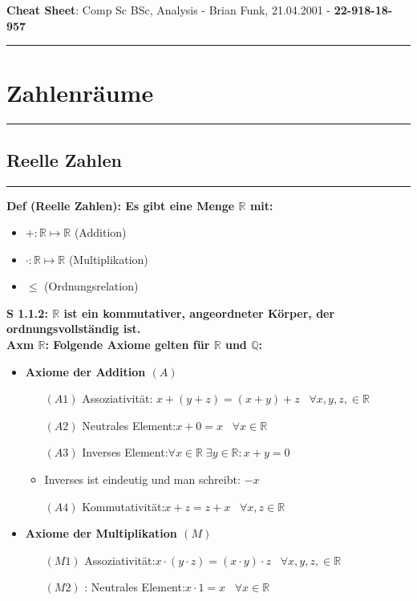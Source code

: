 \documentclass[7pt,landscape, margin = 0.1mm]{article}
\newcommand{\titellinie}{\rule{1.\linewidth}{0.75pt}}
\newcommand*{\mysection}[2][black]{\vskip 0pt \titellinie\vspace{-20pt}\section{#2}\vspace{-14pt}\titellinie \colorlet{chaptecolor}{#1}}
\newcommand*{\mysubsection}[1]{\vspace{-2mm}\color{chaptercolor}\subsection{ #1 }
\vspace{-1mm}\hrule\vspace{1.5mm}\color{black}
\vspace{2mm}}
\newcommand{\COL}[1]{ \color{chaptercolor} \bf{#1}\color{black}     \\}
\newcommand{\DEF}[2]{\color{chaptercolor}\bf{Def #1}:\color{black}    \hspace{0.2cm} #2 \\}
\newcommand{\SA}[2]{\color{chaptercolor}\bf{S #1}:\color{black}    \hspace{0.2cm} #2 \\}
\newcommand{\AX}[2]{\color{chaptercolor}\bf{Axm #1}:\color{black}    \hspace{0.2cm} #2 \\}
\begin{document}
\syntaxonly
\centering
{}
\raggedcolumns

\scriptsize

\begin{center}
     \Large{\textbf{Cheat Sheet}: Comp Sc BSc, Analysis - Brian Funk, 21.04.2001 - \textbf{22-918-18-957}} \\
\end{center}
\begin{multicols}{4}
\setlength{\premulticols}{0.5pt}
\setlength{\postmulticols}{0.5pt}
\setlength{\multicolsep}{0.5pt}
\setlength{\columnsep}{0.2pt}
\setlength{\columnseprule}{0.4pt}

\begin{flushleft}

\mysection[red]{\centering Zahlenräume}
\mysubsection{Reelle Zahlen}
\DEF{(Reelle Zahlen)}{Es gibt eine Menge $\mathbb{R}$ mit:
\begin{itemize}
\item $+: \mathbb{R} \mapsto \mathbb{R}$ (Addition)
\item $\cdot : \mathbb{R} \mapsto \mathbb{R}$ (Multiplikation)
\item $\leq$ (Ordnungsrelation)}
\end{itemize}
\SA{1.1.2}{$\mathbb{R}$ ist ein kommutativer, angeordneter Körper, der ordnungsvollständig ist.}
\AX{$\mathbb{R}$}{Folgende Axiome gelten für $\mathbb{R}$ und $\mathbb{Q}$:
\begin{itemize}
\item \COL{Axiome der Addition $(A)$}
\begin{itemize}
\item[$(A1)$] Assoziativität: $x + (y + z) = (x+y)+z \; \; \; \forall x,y,z, \in \mathbb{R}$
\item[$(A2)$] Neutrales Element:$x + 0 = x \; \; \; \forall x \in \mathbb{R}$
\item [$(A3)$] Inverses Element:$\forall x \in \mathbb{R} \; \exists y \in \mathbb{R}: x+y = 0$
\item Inverses ist eindeutig und man schreibt: $-x$
\item[$(A4)$] Kommutativität:$x+z = z+x \; \; \; \forall x,z \in \mathbb{R}$
\end{itemize}
\item \COL{Axiome der Multiplikation $(M)$}
\begin{itemize}
\item[$(M1)$] Assoziativität:$x \cdot (y \cdot z) = (x\cdot y)\cdot z \; \; \; \forall x,y,z, \in \mathbb{R}$
\item[$(M2)$]: Neutrales Element:$x \cdot 1 = x \; \; \; \forall x \in \mathbb{R}$

\end{itemize}
\end{itemize}}
\end{flushleft}
\end{multicols}
\end{document}
